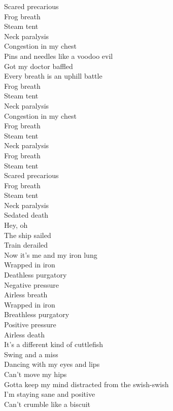 Scared precarious \\
Frog breath \\
Steam tent \\
Neck paralysis \\
Congestion in my chest \\
Pins and needles like a voodoo evil \\
Got my doctor baffled \\
Every breath is an uphill battle \\
Frog breath \\
Steam tent \\
Neck paralysis \\
Congestion in my chest \\

Frog breath \\
Steam tent \\
Neck paralysis \\
Frog breath \\
Steam tent \\
Scared precarious \\
Frog breath \\
Steam tent \\
Neck paralysis \\
Sedated death \\

Hey, oh \\
The ship sailed \\
Train derailed \\
Now it's me and my iron lung \\
Wrapped in iron \\
Deathless purgatory \\
Negative pressure \\
Airless breath \\
Wrapped in iron \\
Breathless purgatory \\
Positive pressure \\
Airless death \\

It's a different kind of cuttlefish \\
Swing and a miss \\
Dancing with my eyes and lips \\
Can't move my hips \\
Gotta keep my mind distracted from the swish-swish \\
I'm staying sane and positive \\
Can't crumble like a biscuit \\

